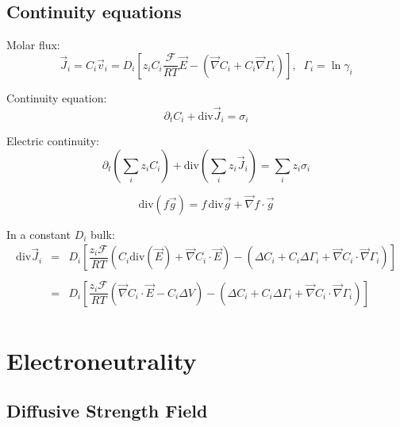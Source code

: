 \documentclass[aps,12pt]{revtex4}
\begin{document}
\subsection{Continuity equations}

Molar flux:
\begin{equation}
	\vec{J}_i = C_i \vec{v}_i = D_i \left[z_i C_i  \dfrac{\mathcal{F}}{RT} \vec{E} - \left(\vec{\nabla} C_i + C_i \vec{\nabla}\Gamma_i\right) \right],\;\;\Gamma_i = \ln \gamma_i
\end{equation}

Continuity equation:
\begin{equation}
	\partial_t C_i + \mathrm{div} \vec{J}_i = \sigma_i
\end{equation}

Electric continuity:
\begin{equation}
	\partial_t \left(\sum_i z_i C_i\right) + \mathrm{div} \left(\sum_i z_i \vec{J}_i\right) = \sum_i z_i \sigma_i
\end{equation}


\begin{equation}
	\mathrm{div}(f\vec{g}) = f \, \mathrm{div}\vec{g} + \vec{\nabla} f \cdot \vec{g}
\end{equation}

In a constant $D_i$ bulk:
\begin{equation}
\begin{array}{rcl}
\mathrm{div} \vec{J}_i & = & D_i \left[ \dfrac{z_i\mathcal{F}}{RT} 
\left(C_i \mathrm{div}\left(\vec{E}\right) + \vec{\nabla} C_i \cdot \vec{E} \right) 
- \left( \Delta C_i + C_i \Delta \Gamma_i + \vec{\nabla} C_i \cdot \vec{\nabla} \Gamma_i \right)
\right]\\
\\
 & = &  D_i \left[ \dfrac{z_i\mathcal{F}}{RT} 
\left(  \vec{\nabla} C_i \cdot \vec{E} - C_i \Delta V \right) 
- \left( \Delta C_i + C_i \Delta \Gamma_i + \vec{\nabla} C_i \cdot \vec{\nabla} \Gamma_i \right)
\right]\\
\end{array}
\end{equation}

\section{Electroneutrality}

\subsection{Diffusive Strength Field}
\end{document}
